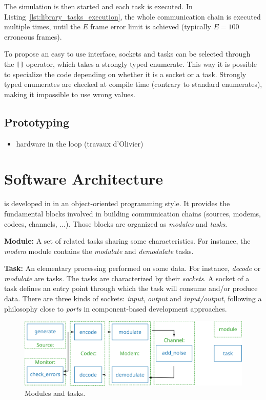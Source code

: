 The simulation is then started and each task is executed. In
Listing~\ref{lst:library_tasks_execution}, the whole communication chain is
executed multiple times, until the $E$ frame error limit is achieved (typically
$E = 100$ erroneous frames).

To propose an easy to use interface, sockets and tasks can be selected through
the \verb|[]| operator, which takes a \Cxx strongly typed enumerate. This way it
is possible to specialize the code depending on whether it is a socket or a
task. Strongly typed enumerates are checked at compile time (contrary to
standard enumerates), making it impossible to use wrong values.

\subsection{Prototyping~\cite{Cassagne2017,Cassagne2017a}}

\begin{itemize}
  \item hardware in the loop (travaux d'Olivier)
\end{itemize}

\section{Software Architecture}
\label{sec:soft_archi}

\AFFECT is developed in \Cxx in an object-oriented programming style. It
provides the fundamental blocks involved in building communication chains
(sources, modems, codecs, channels, ...). Those blocks are organized as
\textit{modules} and \textit{tasks}.

\textbf{Module:} A set of related tasks sharing some characteristics. For
instance, the \textit{modem} module contains the \textit{modulate} and
\textit{demodulate} tasks.

\textbf{Task:} An elementary processing performed on some data. For instance,
\textit{decode} or \textit{modulate} are tasks. The tasks are characterized by
their \textit{sockets}. A socket of a task defines an entry point through which
the task will consume and/or produce data. There are three kinds of sockets:
\textit{input}, \textit{output} and \textit{input/output}, following a
philosophy close to \emph{ports} in component-based development approaches.

\begin{figure}
  \centering
  \includegraphics[width=1.00\linewidth]{soft_archi/com_chain_task_module}
  \caption{Modules and tasks.}
  \label{fig:soft_archi_com_chain_task_module}
\end{figure}

